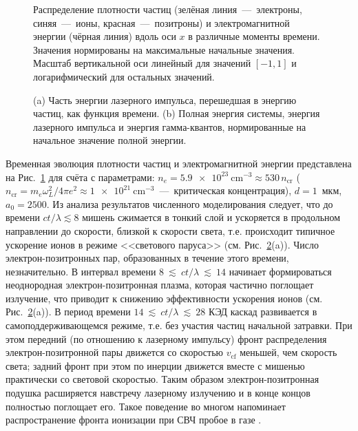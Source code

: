 \begin{figure}[h!]
	\caption[Распределение плотности частиц и электромагнитной энергии в различные моменты времени в численном моделировании]{\label{Sim_res} Распределение плотности частиц (зелёная линия~---~электроны, синяя~---~ионы, красная~---~позитроны) и электромагнитной энергии (чёрная линия) вдоль оси $x$ в различные моменты времени. Значения нормированы на максимальные начальные значения. Масштаб вертикальной оси линейный для значений $[-1,1]$ и логарифмический для остальных значений.}
\end{figure}

\begin{figure}[h!]
	\caption[Баланс энергии в системе в численном моделировании с параметрами $n_{e}=\SI{5.9e23}{\centi\meter^{-3}}$, $d=1$~мкм, $a_{0}=2500$]{\label{Sim_en} (a) Часть энергии лазерного импульса, перешедшая в энергию частиц, как функция времени. (b) Полная энергия системы, энергия лазерного импульса и энергия гамма-квантов, нормированные на начальное значение полной энергии.}
\end{figure}

Временная эволюция плотности частиц и электромагнитной энергии представлена на Рис.~\ref{Sim_res} для счёта с параметрами: ${n_{e}=\SI{5.9e23}{\centi\meter^{-3}}\approx530\, n_\mathrm{cr}}$ (${n_\mathrm{cr}=m_{e}\omega_{L}^{2}/4\pi e^{2}\approx\SI{1e21}{\centi\meter^{-3}}}$~---~критическая концентрация), $d=1$~мкм, $a_{0}=2500$. 
Из анализа результатов численного моделирования следует, что до времени $ct/\lambda\lesssim 8$ мишень сжимается в тонкий слой и ускоряется в продольном направлении до скорости, близкой к скорости света, т.е. происходит типичное ускорение ионов в режиме <<светового паруса>> (см. Рис.~\ref{Sim_en}\;(a)). 
Число электрон-позитронных пар, образованных в течение этого времени, незначительно. В интервал времени $8~\lesssim~ct/\lambda~\lesssim~14$ начинает формироваться неоднородная электрон-позитронная плазма, которая частично поглощает излучение, что приводит к снижению эффективности ускорения ионов (см. Рис.~\ref{Sim_en}\;(a)).
В период времени $14~\lesssim~ct/\lambda~\lesssim~28$ КЭД каскад развивается в самоподдерживающемся режиме, т.е. без участия частиц начальной затравки. 
При этом передний (по отношению к лазерному импульсу) фронт распределения электрон-позитронной пары движется со скоростью $v_\mathrm{cf}$ меньшей, чем скорость света; задний фронт при этом по инерции движется вместе с мишенью практически со световой скоростью. 
Таким образом электрон-позитронная подушка расширяется навстречу лазерному излучению и в конце концов полностью поглощает его. 
Такое поведение во многом напоминает распространение фронта ионизации при СВЧ пробое в газе \cite{semenov1982breakdown}.

